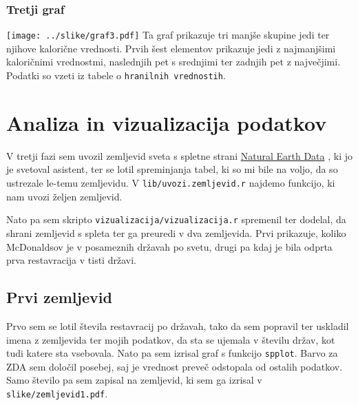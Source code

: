 \documentclass[hidelinks, 11pt,a4paper]{article}
\begin{document}
\subsubsection{Tretji graf}
\texttt{[image: ../slike/graf3.pdf]}
Ta graf prikazuje tri manjše skupine jedi ter njihove kalorične vrednosti. Prvih šest elementov prikazuje jedi z najmanjšimi kaloričnimi vrednostmi, naslednjih pet s srednjimi ter zadnjih pet z največjimi. Podatki so vzeti iz tabele o \verb|hranilnih vrednostih|.

\newpage

\section{Analiza in vizualizacija podatkov}


V tretji fazi sem uvozil zemljevid sveta s spletne strani \href{http://www.naturalearthdata.com/http//www.naturalearthdata.com/download/50m/cultural/ne_50m_admin_0_countries.zip}{Natural Earth Data} \cite{bib:NED}, ki jo je svetoval asistent, ter se lotil spreminjanja tabel, ki so mi bile na voljo, da so ustrezale le-temu zemljevidu. V \verb|lib/uvozi.zemljevid.r| najdemo funkcijo, ki nam uvozi željen zemljevid. \par

Nato pa sem skripto \verb|vizualizacija/vizualizacija.r| spremenil ter dodelal, da shrani zemljevid s spleta ter ga preuredi v dva zemljevida. Prvi prikazuje, koliko McDonaldsov je v posameznih državah po svetu, drugi pa kdaj je bila odprta prva restavracija v tisti državi. \\[0.5mm]

\subsection{Prvi zemljevid}
Prvo sem se lotil števila restavracij po državah, tako da sem popravil ter uskladil imena z zemljevida ter mojih podatkov, da sta se ujemala v številu držav, kot tudi katere sta vsebovala. Nato pa sem izrisal graf s funkcijo \verb|spplot|. Barvo za ZDA sem določil posebej, saj je vrednost preveč odstopala od ostalih podatkov. Samo število pa sem zapisal na zemljevid, ki sem ga izrisal v \verb|slike/zemljevid1.pdf|. \\[0.5mm]
\end{document}
